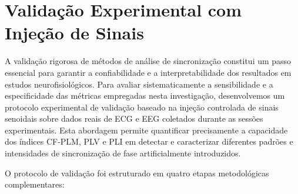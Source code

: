 \section{Validação Experimental com Injeção de Sinais}
A validação rigorosa de métodos de análise de sincronização constitui um passo essencial para garantir a confiabilidade e a interpretabilidade dos resultados em estudos neurofisiológicos. Para avaliar sistematicamente a sensibilidade e a especificidade das métricas empregadas nesta investigação, desenvolvemos um protocolo experimental de validação baseado na injeção controlada de sinais senoidais sobre dados reais de ECG e EEG coletados durante as sessões experimentais. Esta abordagem permite quantificar precisamente a capacidade dos índices CF-PLM, PLV e PLI em detectar e caracterizar diferentes padrões e intensidades de sincronização de fase artificialmente introduzidos.

O protocolo de validação foi estruturado em quatro etapas metodológicas complementares:

